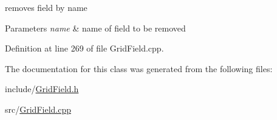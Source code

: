 removes field by name 


\begin{DoxyParams}{Parameters}
{\em name} & name of field to be removed \\
\hline
\end{DoxyParams}


Definition at line 269 of file Grid\-Field.\-cpp.



The documentation for this class was generated from the following files\-:\begin{DoxyCompactItemize}
\item 
include/\hyperlink{GridField_8h}{Grid\-Field.\-h}\item 
src/\hyperlink{GridField_8cpp}{Grid\-Field.\-cpp}\end{DoxyCompactItemize}
